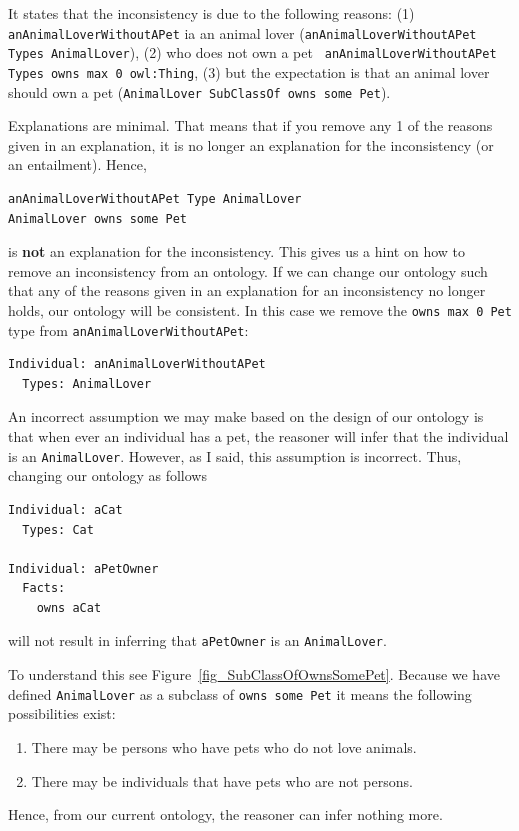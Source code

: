 \documentclass{amsart}
\begin{document}
It states that the inconsistency is due to the following reasons: (1) \texttt{anAnimalLoverWithoutAPet} ia an animal lover (\texttt{anAnimalLoverWithoutAPet Types AnimalLover}), (2) who does not own a pet \texttt{ anAnimalLoverWithoutAPet Types owns max 0 owl:Thing}, (3) but the expectation is that an animal lover should own a pet (\texttt{AnimalLover SubClassOf owns some Pet}).

Explanations are minimal. That means that if you remove any 1 of the reasons given in an explanation, it is no longer an explanation for the inconsistency (or an entailment). Hence, 
\begin{small}
\begin{verbatim} 
anAnimalLoverWithoutAPet Type AnimalLover
AnimalLover owns some Pet
\end{verbatim}
\end{small} 
is \textbf{not} an explanation for the inconsistency. This gives us a hint on how to remove an inconsistency from an ontology. If we can change our ontology such that any of the reasons given in an explanation for an inconsistency no longer holds, our ontology will be consistent. In this case we remove the \texttt{owns max 0 Pet} type from \texttt{anAnimalLoverWithoutAPet}:
\begin{small}
\begin{verbatim} 
Individual: anAnimalLoverWithoutAPet
  Types: AnimalLover
\end{verbatim}
\end{small} 


An incorrect assumption we may make based on the design of our ontology is that when ever an individual has a pet, the reasoner will infer that the individual is an \texttt{AnimalLover}. However, as I said, this assumption is incorrect. Thus, changing our ontology as follows

\begin{small}
\begin{verbatim} 
Individual: aCat
  Types: Cat

Individual: aPetOwner
  Facts: 
    owns aCat
\end{verbatim}
\end{small} 
will not result in inferring that \texttt{aPetOwner} is an \texttt{AnimalLover}.

To understand this see Figure~\ref{fig_SubClassOfOwnsSomePet}. Because we have defined \texttt{AnimalLover} as a subclass of \texttt{owns some Pet} it means the following possibilities exist:
\begin{enumerate}
 \item There may be persons who have pets who do not love animals.
 \item There may be individuals that have pets who are not persons.
\end{enumerate}
Hence, from our current ontology, the reasoner can infer nothing more.
\end{document}

